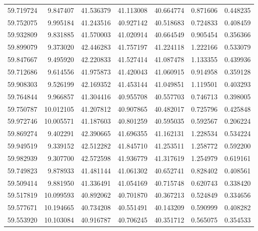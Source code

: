 \begin{tabular}{rrrrrrr}
 59.719724 &   9.847407 &         41.536379 &         41.113008 &         40.664774 &  0.871606 &  0.448235 \\
 59.752075 &   9.995184 &         41.243516 &         40.927142 &         40.518683 &  0.724833 &  0.408459 \\
 59.932809 &   9.831885 &         41.570003 &         41.020914 &         40.664549 &  0.905454 &  0.356366 \\
 59.899079 &   9.373020 &         42.446283 &         41.757197 &         41.224118 &  1.222166 &  0.533079 \\
 59.847667 &   9.495920 &         42.220833 &         41.527414 &         41.087478 &  1.133355 &  0.439936 \\
 59.712686 &   9.614556 &         41.975873 &         41.420043 &         41.060915 &  0.914958 &  0.359128 \\
 59.908303 &   9.526199 &         42.169352 &         41.453144 &         41.049851 &  1.119501 &  0.403293 \\
 59.764844 &   9.966857 &         41.304416 &         40.955708 &         40.557703 &  0.746713 &  0.398005 \\
 59.750787 &  10.012105 &         41.207812 &         40.907865 &         40.482017 &  0.725796 &  0.425848 \\
 59.972746 &  10.005571 &         41.187603 &         40.801259 &         40.595035 &  0.592567 &  0.206224 \\
 59.869274 &   9.402291 &         42.390665 &         41.696355 &         41.162131 &  1.228534 &  0.534224 \\
 59.949519 &   9.339152 &         42.512282 &         41.845710 &         41.253511 &  1.258772 &  0.592200 \\
 59.982939 &   9.307700 &         42.572598 &         41.936779 &         41.317619 &  1.254979 &  0.619161 \\
 59.749823 &   9.878933 &         41.481144 &         41.061302 &         40.652741 &  0.828402 &  0.408561 \\
 59.509414 &   9.881950 &         41.336491 &         41.054169 &         40.715748 &  0.620743 &  0.338420 \\
 59.517819 &  10.099593 &         40.892062 &         40.701870 &         40.367213 &  0.524849 &  0.334656 \\
 59.577671 &  10.194665 &         40.734208 &         40.551491 &         40.143209 &  0.590999 &  0.408282 \\
 59.553920 &  10.103084 &         40.916787 &         40.706245 &         40.351712 &  0.565075 &  0.354533 \\

\end{tabular}
